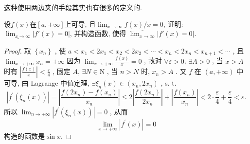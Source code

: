 

这种使用两边夹的手段其实也有很多的定义的. 

\begin{prob} %
    设$f(x)$在$[a, +\infty]$上可导, 且$\lim_{x\to \infty}f(x)/x=0$, 证明: $\underline{\lim_{x\to \infty}} |f'(x)=0|$, 并构造函数, 使得 $\overline{\lim_{x\to \infty}} |f'(x)=0|$.

\end{prob} 

\begin{proof}
取  $\left\{x_{n}\right\}$ , 使  $a<x_{1}<2 x_{1}<x_{2}<2 x_{2}<\cdots<x_{n}<2 x_{n}<x_{n+1}<\cdots$ , 且  $\lim _{x \rightarrow+\infty} x_{n}=   +\infty$ 
因为  $\lim _{x \rightarrow+\infty} \frac{f(x)}{x}=0$ , 故对  $\forall \varepsilon>0$, $\exists A>0$ , 当  $x>A$  时有  $\left|\frac{f(x)}{x}\right|<\frac{\varepsilon}{4}$ , 固定  $A$, $\exists N \in \mathrm{N}$ , 当  $n>N$  时,  $x_{n}>A$ . 又  $f$  在  $(a,+\infty)$  中可导, 由 Lagrange 中值定理,  $\exists \xi_{n}(x) \in\left(x_{n}, 2 x_{n}\right)$ , s. t.
$$
\left|f^{\prime}\left(\xi_{n}(x)\right)\right|=\left|\frac{f\left(2 x_{n}\right)-f\left(x_{n}\right)}{x_{n}}\right| \leqslant 2\left|\frac{f\left(2 x_{n}\right)}{2 x_{n}}\right|+\left|\frac{f\left(x_{n}\right)}{x_{n}}\right|<2 \cdot \frac{\varepsilon}{4}+\frac{\varepsilon}{4}<\varepsilon .
$$
所以  $\lim _{n \rightarrow+\infty}\left|f^{\prime}\left(\xi_{n}(x)\right)\right|=0$ , 从而
$$
\lim _{x \rightarrow+\infty}\left|f^{\prime}(x)\right|=0
$$
构造的函数是$\sin x$. 
\end{proof}

